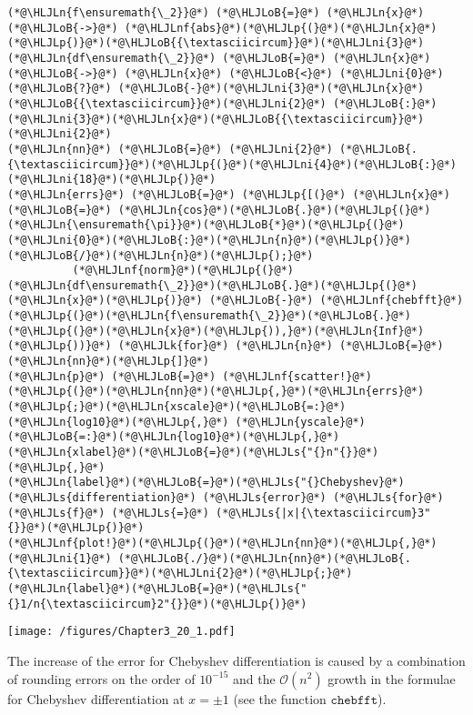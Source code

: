 \documentclass[12pt,a4paper]{article}
\newcommand{\HLJLk}[1]{\textcolor[RGB]{148,91,176}{\textbf{#1}}}
\newcommand{\HLJLn}[1]{#1}
\newcommand{\HLJLnf}[1]{\textcolor[RGB]{66,102,213}{#1}}
\newcommand{\HLJLs}[1]{\textcolor[RGB]{201,61,57}{#1}}
\newcommand{\HLJLni}[1]{\textcolor[RGB]{59,151,46}{#1}}
\newcommand{\HLJLoB}[1]{\textcolor[RGB]{102,102,102}{\textbf{#1}}}
\newcommand{\HLJLp}[1]{#1}
\begin{document}
\begin{lstlisting}
(*@\HLJLn{f\ensuremath{\_2}}@*) (*@\HLJLoB{=}@*) (*@\HLJLn{x}@*) (*@\HLJLoB{->}@*) (*@\HLJLnf{abs}@*)(*@\HLJLp{(}@*)(*@\HLJLn{x}@*)(*@\HLJLp{)}@*)(*@\HLJLoB{{\textasciicircum}}@*)(*@\HLJLni{3}@*)
(*@\HLJLn{df\ensuremath{\_2}}@*) (*@\HLJLoB{=}@*) (*@\HLJLn{x}@*) (*@\HLJLoB{->}@*) (*@\HLJLn{x}@*) (*@\HLJLoB{<}@*) (*@\HLJLni{0}@*) (*@\HLJLoB{?}@*) (*@\HLJLoB{-}@*)(*@\HLJLni{3}@*)(*@\HLJLn{x}@*)(*@\HLJLoB{{\textasciicircum}}@*)(*@\HLJLni{2}@*) (*@\HLJLoB{:}@*) (*@\HLJLni{3}@*)(*@\HLJLn{x}@*)(*@\HLJLoB{{\textasciicircum}}@*)(*@\HLJLni{2}@*)
(*@\HLJLn{nn}@*) (*@\HLJLoB{=}@*) (*@\HLJLni{2}@*) (*@\HLJLoB{.{\textasciicircum}}@*)(*@\HLJLp{(}@*)(*@\HLJLni{4}@*)(*@\HLJLoB{:}@*)(*@\HLJLni{18}@*)(*@\HLJLp{)}@*)
(*@\HLJLn{errs}@*) (*@\HLJLoB{=}@*) (*@\HLJLp{[(}@*) (*@\HLJLn{x}@*) (*@\HLJLoB{=}@*) (*@\HLJLn{cos}@*)(*@\HLJLoB{.}@*)(*@\HLJLp{(}@*)(*@\HLJLn{\ensuremath{\pi}}@*)(*@\HLJLoB{*}@*)(*@\HLJLp{(}@*)(*@\HLJLni{0}@*)(*@\HLJLoB{:}@*)(*@\HLJLn{n}@*)(*@\HLJLp{)}@*)(*@\HLJLoB{/}@*)(*@\HLJLn{n}@*)(*@\HLJLp{);}@*)
          (*@\HLJLnf{norm}@*)(*@\HLJLp{(}@*)(*@\HLJLn{df\ensuremath{\_2}}@*)(*@\HLJLoB{.}@*)(*@\HLJLp{(}@*)(*@\HLJLn{x}@*)(*@\HLJLp{)}@*) (*@\HLJLoB{-}@*) (*@\HLJLnf{chebfft}@*)(*@\HLJLp{(}@*)(*@\HLJLn{f\ensuremath{\_2}}@*)(*@\HLJLoB{.}@*)(*@\HLJLp{(}@*)(*@\HLJLn{x}@*)(*@\HLJLp{)),}@*)(*@\HLJLn{Inf}@*)(*@\HLJLp{))}@*) (*@\HLJLk{for}@*) (*@\HLJLn{n}@*) (*@\HLJLoB{=}@*) (*@\HLJLn{nn}@*)(*@\HLJLp{]}@*)
(*@\HLJLn{p}@*) (*@\HLJLoB{=}@*) (*@\HLJLnf{scatter!}@*)(*@\HLJLp{(}@*)(*@\HLJLn{nn}@*)(*@\HLJLp{,}@*)(*@\HLJLn{errs}@*)(*@\HLJLp{;}@*)(*@\HLJLn{xscale}@*)(*@\HLJLoB{=:}@*)(*@\HLJLn{log10}@*)(*@\HLJLp{,}@*) (*@\HLJLn{yscale}@*)(*@\HLJLoB{=:}@*)(*@\HLJLn{log10}@*)(*@\HLJLp{,}@*)(*@\HLJLn{xlabel}@*)(*@\HLJLoB{=}@*)(*@\HLJLs{"{}n"{}}@*)(*@\HLJLp{,}@*)
(*@\HLJLn{label}@*)(*@\HLJLoB{=}@*)(*@\HLJLs{"{}Chebyshev}@*) (*@\HLJLs{differentiation}@*) (*@\HLJLs{error}@*) (*@\HLJLs{for}@*) (*@\HLJLs{f}@*) (*@\HLJLs{=}@*) (*@\HLJLs{|x|{\textasciicircum}3"{}}@*)(*@\HLJLp{)}@*)
(*@\HLJLnf{plot!}@*)(*@\HLJLp{(}@*)(*@\HLJLn{nn}@*)(*@\HLJLp{,}@*)(*@\HLJLni{1}@*) (*@\HLJLoB{./}@*)(*@\HLJLn{nn}@*)(*@\HLJLoB{.{\textasciicircum}}@*)(*@\HLJLni{2}@*)(*@\HLJLp{;}@*)(*@\HLJLn{label}@*)(*@\HLJLoB{=}@*)(*@\HLJLs{"{}1/n{\textasciicircum}2"{}}@*)(*@\HLJLp{)}@*)
\end{lstlisting}

\texttt{[image: /figures/Chapter3\_20\_1.pdf]}

The increase of the error for Chebyshev differentiation is caused by a combination of rounding errors on the order of $10^{-15}$ and the $\mathcal{O}(n^2)$ growth in the formulae for Chebyshev differentiation at $x = \pm 1$ (see the function $\texttt{chebfft}$).
\end{document}
